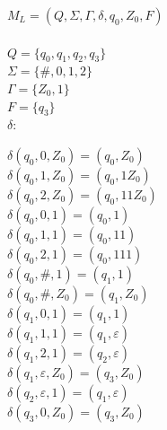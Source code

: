 \documentclass[11pt,a4paper]{article}
\begin{document}
$M_L = (Q,\Sigma,\Gamma,\delta,q_0,Z_0,F)$\\
\\
$Q = \{q_0,q_1,q_2,q_3\}$\\
$\Sigma = \{\#,0,1,2\}$\\
$\Gamma = \{Z_0,1\}$\\
$F = \{q_3\}$\\
$\delta$:\\[-2.9em]
\begin{center}
\begin{minipage}{0.9\textwidth}
$\delta(q_0,0,Z_0)           = (q_0,Z_0)$\\
$\delta(q_0,1,Z_0)           = (q_0,1Z_0)$\\
$\delta(q_0,2,Z_0)           = (q_0,11Z_0)$\\
$\delta(q_0,0,1)             = (q_0,1)$\\
$\delta(q_0,1,1)             = (q_0,11)$\\
$\delta(q_0,2,1)             = (q_0,111)$\\
$\delta(q_0,\#,1)            = (q_1,1)$\\
$\delta(q_0,\#,Z_0)          = (q_1,Z_0)$\\
$\delta(q_1,0,1)             = (q_1,1)$\\
$\delta(q_1,1,1)             = (q_1,\varepsilon)$\\
$\delta(q_1,2,1)             = (q_2,\varepsilon)$\\
$\delta(q_1,\varepsilon,Z_0) = (q_3,Z_0)$\\
$\delta(q_2,\varepsilon,1)   = (q_1,\varepsilon)$\\
$\delta(q_3,0,Z_0)           = (q_3,Z_0)$\\
\end{minipage}
\end{center}
\end{document}
